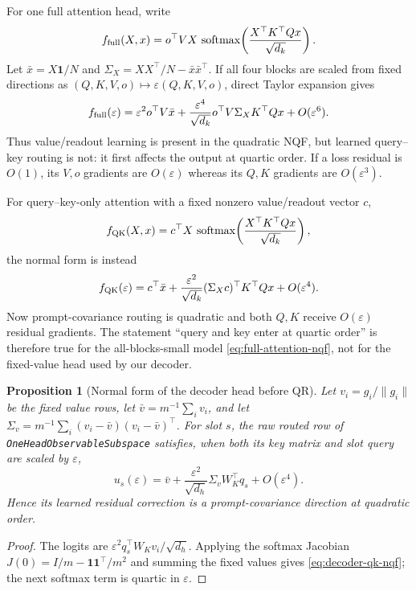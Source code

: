 \documentclass[11pt]{article}
\newtheorem{proposition}{Proposition}
\begin{document}
For one full attention head, write
\begin{equation}
 f_{\rm full}(X,x)
 =o^\top V X\,\operatorname{softmax}\!\left(
 \frac{X^\top K^\top Qx}{\sqrt{d_k}}
 \right).
 \label{eq:full-attention-nqf}
\end{equation}
Let $\bar x=X\mathbf 1/N$ and
$\Sigma_X=XX^\top/N-\bar x\bar x^\top$.  If all four blocks are scaled from
fixed directions as $(Q,K,V,o)\mapsto
\varepsilon(Q,K,V,o)$, direct Taylor expansion gives
\begin{equation}
 f_{\rm full}(\varepsilon)
 =\varepsilon^2 o^\top V\bar x
 +\frac{\varepsilon^4}{\sqrt{d_k}}
 o^\top V\Sigma_XK^\top Qx+O(\varepsilon^6).
 \label{eq:full-attention-orders}
\end{equation}
Thus value/readout learning is present in the quadratic NQF, but learned
query--key routing is not: it first affects the output at quartic order.  If a
loss residual is $O(1)$, its $V,o$ gradients are $O(\varepsilon)$ whereas its
$Q,K$ gradients are $O(\varepsilon^3)$.

For query--key-only attention with a fixed nonzero value/readout vector $c$,
\begin{equation}
 f_{\rm QK}(X,x)
 =c^\top X\,\operatorname{softmax}\!\left(
 \frac{X^\top K^\top Qx}{\sqrt{d_k}}
 \right),
\end{equation}
the normal form is instead
\begin{equation}
 f_{\rm QK}(\varepsilon)
 =c^\top\bar x
 +\frac{\varepsilon^2}{\sqrt{d_k}}
 (\Sigma_Xc)^\top K^\top Qx+O(\varepsilon^4).
 \label{eq:qk-only-orders}
\end{equation}
Now prompt-covariance routing is quadratic and both $Q,K$ receive
$O(\varepsilon)$ residual gradients.  The statement ``query and key enter at
quartic order'' is therefore true for the all-blocks-small model
\eqref{eq:full-attention-nqf}, not for the fixed-value head used by our
decoder.

\begin{proposition}[Normal form of the decoder head before QR]
Let $v_i=g_i/\|g_i\|$ be the fixed value rows, let
$\bar v=m^{-1}\sum_i v_i$, and let
$\Sigma_v=m^{-1}\sum_i(v_i-\bar v)(v_i-\bar v)^\top$.  For slot $s$, the raw
routed row of \texttt{OneHeadObservableSubspace} satisfies, when both its key
matrix and slot query are scaled by $\varepsilon$,
\begin{equation}
 u_s(\varepsilon)
 =\bar v+\frac{\varepsilon^2}{\sqrt{d_h}}
 \Sigma_vW_K^\top q_s+O(\varepsilon^4).
 \label{eq:decoder-qk-nqf}
\end{equation}
Hence its learned residual correction is a prompt-covariance direction at
quadratic order.
\end{proposition}
\begin{proof}
The logits are
$\varepsilon^2q_s^\top W_Kv_i/\sqrt{d_h}$.  Applying the softmax Jacobian
$J(0)=I/m-\mathbf1\mathbf1^\top/m^2$ and summing the fixed values gives
\eqref{eq:decoder-qk-nqf}; the next softmax term is quartic in
$\varepsilon$.
\end{proof}
\end{document}
